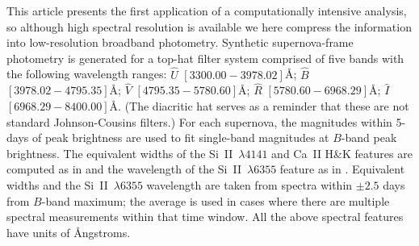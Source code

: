 \documentclass[trackchanges]{aastex61}   	%
\begin{document}
This article presents the first application of a computationally intensive analysis, so although  high spectral resolution
is available we here compress the information into low-resolution broadband photometry. 
Synthetic supernova-frame photometry is generated for a top-hat filter system
comprised of five 
bands with the following wavelength ranges: ${\hat{U}}$ $[3300.00 - 3978.02]$\AA;
${\hat{B}}$ $[3978.02-4795.35]$\AA;
$\hat{V}$ $[4795.35-5780.60]$\AA;
$\hat{R}$ $[5780.60-6968.29]$\AA;
$\hat{I}$ $[6968.29-8400.00]$\AA.
(The diacritic hat serves as a reminder that these are not standard Johnson-Cousins filters.)
For each supernova, the magnitudes within 5-days of peak brightness are used to fit single-band magnitudes
at $B$-band peak brightness.
The equivalent widths of the Si~II~$\lambda 4141$ and Ca~II H\&K features are computed as
in \citet{2008A&A...477..717B} and the 
wavelength of the Si~II~$\lambda 6355$ feature
as in \citet{chotard:thesis, 2017Chotard}.
Equivalent widths and the
Si~II~$\lambda 6355$ wavelength are taken from spectra  within $\pm 2.5$ days from $B$-band maximum;
the average is used  in cases where there are multiple spectral measurements within that time window.
All the above spectral features have units of \AA ngstroms.
\end{document}
